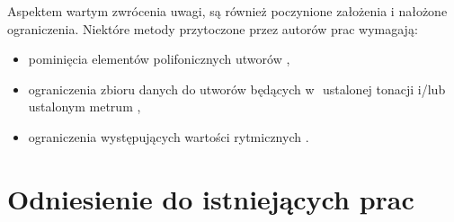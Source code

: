 {{    Aspektem wartym zwrócenia uwagi, są również poczynione założenia i\,\,nałożone
    ograniczenia. Niektóre metody przytoczone przez autorów prac wymagają:
    \begin{itemize}
      \setlength\itemsep{-0.5em}
      \item pominięcia elementów polifonicznych utworów \cite{Hadjeres2016DeepBachAS, Sturm2015FolkMS},
      \item ograniczenia zbioru danych do utworów będących w\,\,
      ustalonej tonacji i/lub ustalonym metrum \cite{Sturm2015FolkMS, Wu2017AHR},
      \item ograniczenia występujących wartości rytmicznych \cite{Hadjeres2016DeepBachAS}.
    \end{itemize}
  }

  \section{Odniesienie do istniejących prac}
  {








  }

}
